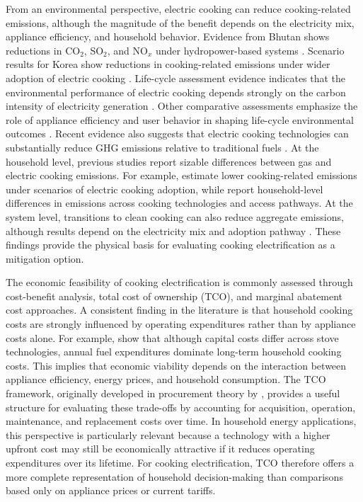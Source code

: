 \documentclass[authoryear,preprint,review,10pt]{elsarticle}
\begin{document}
From an environmental perspective, electric cooking can reduce cooking-related emissions, although the magnitude of the benefit depends on the electricity mix, appliance efficiency, and household behavior. Evidence from Bhutan shows reductions in CO$_2$, SO$_2$, and NO$_x$ under hydropower-based systems \citep{yangka2016}. Scenario results for Korea show reductions in cooking-related emissions under wider adoption of electric cooking \citep{im2020}. Life-cycle assessment evidence indicates that the environmental performance of electric cooking depends strongly on the carbon intensity of electricity generation \citep{lee2021}. Other comparative assessments emphasize the role of appliance efficiency and user behavior in shaping life-cycle environmental outcomes \citep{bandekar2022}. Recent evidence also suggests that electric cooking technologies can substantially reduce GHG emissions relative to traditional fuels \citep{scott2024energy}. At the household level, previous studies report sizable differences between gas and electric cooking emissions. For example, \citet{im2020} estimate lower cooking-related emissions under scenarios of electric cooking adoption, while \citet{dagnachew2020scenario} report household-level differences in emissions across cooking technologies and access pathways. At the system level, transitions to clean cooking can also reduce aggregate emissions, although results depend on the electricity mix and adoption pathway \citep{dagnachew2020scenario}. These findings provide the physical basis for evaluating cooking electrification as a mitigation option.

The economic feasibility of cooking electrification is commonly assessed through cost-benefit analysis, total cost of ownership (TCO), and marginal abatement cost approaches. A consistent finding in the literature is that household cooking costs are strongly influenced by operating expenditures rather than by appliance costs alone. For example, \citet{dagnachew2020scenario} show that although capital costs differ across stove technologies, annual fuel expenditures dominate long-term household cooking costs. This implies that economic viability depends on the interaction between appliance efficiency, energy prices, and household consumption. The TCO framework, originally developed in procurement theory by \citet{ellram1994taxonomy}, provides a useful structure for evaluating these trade-offs by accounting for acquisition, operation, maintenance, and replacement costs over time. In household energy applications, this perspective is particularly relevant because a technology with a higher upfront cost may still be economically attractive if it reduces operating expenditures over its lifetime. For cooking electrification, TCO therefore offers a more complete representation of household decision-making than comparisons based only on appliance prices or current tariffs.
\end{document}
